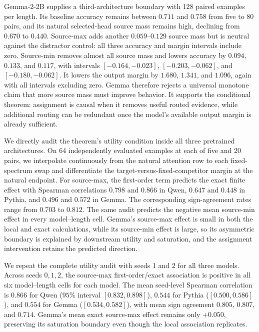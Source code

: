 \documentclass[letterpaper]{article} %
\begin{document}
Gemma-2-2B supplies a third-architecture boundary with 128 paired examples per length. Its baseline accuracy
remains between $0.711$ and $0.758$ from five to 80 pairs, and its natural selected-head source mass remains
high, declining from $0.670$ to $0.440$. Source-max adds another $0.059$--$0.129$ source mass but is neutral
against the distractor control: all three accuracy and margin intervals include zero. Source-min removes
almost all source mass and lowers accuracy by $0.094$, $0.133$, and $0.117$, with intervals
$[-0.164,-0.023]$, $[-0.203,-0.062]$, and $[-0.180,-0.062]$. It lowers the output margin by $1.680$,
$1.341$, and $1.096$, again with all intervals excluding zero. Gemma therefore rejects a universal
monotone claim that more source mass must improve behavior. It supports the conditional theorem: assignment
is causal when it removes useful routed evidence, while additional routing can be redundant once the model's
available output margin is already sufficient.

We directly audit the theorem's utility condition inside all three pretrained architectures.
On 64 independently evaluated examples at each of five and 20 pairs, we interpolate continuously from the
natural attention row to each fixed-spectrum swap and differentiate the target-versus-fixed-competitor
margin at the natural endpoint.
For source-max, the first-order term predicts the exact finite effect with Spearman correlations
$0.798$ and $0.866$ in Qwen, $0.647$ and $0.448$ in Pythia, and $0.496$ and $0.572$ in Gemma.
The corresponding sign-agreement rates range from $0.703$ to $0.812$.
The same audit predicts the negative mean source-min effect in every model--length cell.
Gemma's source-max effect is small in both the local and exact calculations, while its source-min effect is
large, so its asymmetric boundary is explained by downstream utility and saturation, and the assignment
intervention retains the predicted direction.

We repeat the complete utility audit with seeds 1 and 2 for all three models. Across seeds $0,1,2$, the
source-max first-order/exact association is positive in all six model--length cells for each model. The mean
seed-level Spearman correlation is $0.866$ for Qwen ($95\%$ interval $[0.832,0.898]$), $0.544$ for Pythia
($[0.500,0.586]$), and $0.554$ for Gemma ($[0.534,0.582]$), with mean sign agreement $0.805$, $0.807$, and
$0.714$. Gemma's mean exact source-max effect remains only $+0.050$, preserving its saturation boundary even
though the local association replicates.
\end{document}
